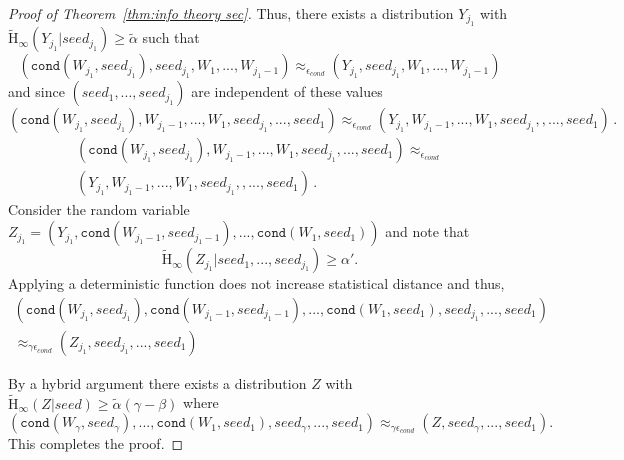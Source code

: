 \documentclass[11pt]{article}
\newcommand{\class}[1]{{\ensuremath{\mathsf{#1}}}}
\newcommand{\sketch}{\ensuremath{\class{SS}}\xspace}
\newcommand{\rec}{\ensuremath{\class{Rec}}\xspace}
\newcommand{\Hoo}{\mathrm{H}_\infty}
\newcommand{\Hav}{\tilde{\mathrm{H}}_\infty}
\newcommand{\ext}{\ensuremath{\mathtt{ext}}}
\newcommand{\cond}{\ensuremath{\mathtt{cond}}}
\begin{document}
\begin{proof}[Proof of Theorem~\ref{thm:info theory sec}]
\noindent
Thus, there exists a distribution $Y_{j_1}$ with $\Hav(Y_{j_1} | seed_{j_1}) \ge \tilde{\alpha}$ such that
\[(\cond (W_{j_1}, seed_{j_1}), seed_{j_1}, W_1,..., W_{j_1-1}) \approx_{\epsilon_{cond}} (Y_{j_1}, seed_{j_1}, W_1,..., W_{j_1-1})\]
and since $(seed_1,..., seed_{j_1})$ are independent of these values
\ifnum{}
\[(\cond (W_{j_1},seed_{j_1}), W_{j_1-1},..., W_1, seed_{j_1}, ..., seed_{1}) \approx_{\epsilon_{cond}} (Y_{j_1}, W_{j_1-1},..., W_1, seed_{j_1}, , ...,  seed_{1})\,.\]
\else
\begin{align*}
(\cond (W_{j_1},seed_{j_1}), W_{j_1-1},..., W_1, seed_{j_1}, ..., seed_{1}) \approx_{\epsilon_{cond}}\\ (Y_{j_1}, W_{j_1-1},..., W_1, seed_{j_1}, , ...,  seed_{1})\,.
\end{align*}
\fi
Consider the random variable $Z_{j_1} =( Y_{j_1}, \cond(W_{j_1-1},seed_{j_1-1}),..., \cond(W_{1}, seed_{1}))$ and note that \[\Hav(Z_{j_1} | seed_1,...,seed_{j_1})\ge \alpha'.\]
Applying a deterministic function does not increase statistical distance and thus,
\begin{align*}
(\cond (W_{j_1}, seed_{j_1}), \cond(W_{j_1-1}, seed_{j_1-1}),..., \cond(W_1, seed_1), seed_{j_1},..., seed_{1}) \\\approx_{\gamma \epsilon_{cond}} (Z_{j_1}, seed_{j_1},..., seed_1)
\end{align*}

\noindent
By a hybrid argument there exists a distribution $Z$ with $\Hav(Z | seed) \ge \tilde{\alpha}(\gamma -\beta)$ where
\[
(\cond(W_\gamma, seed_\gamma), ..., \cond(W_1, seed_1), seed_\gamma,..., seed_1) \approx_{\gamma \epsilon_{cond}} (Z, seed_\gamma,...,  seed_1).\]
This completes the proof.
\end{proof}
\end{document}
